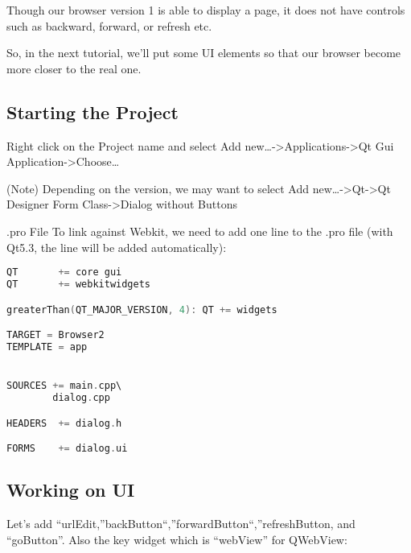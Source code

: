 Though our browser version 1 is able to display a page, it does not have
controls such as backward, forward, or refresh etc.

So, in the next tutorial, we'll put some UI elements so that our browser
become more closer to the real one.

\subsection{Starting the Project}\label{starting-the-project}

Right click on the Project name and select Add
new\ldots{}-\textgreater{}Applications-\textgreater{}Qt Gui
Application-\textgreater{}Choose\ldots{}

(Note) Depending on the version, we may want to select Add
new\ldots{}-\textgreater{}Qt-\textgreater{}Qt Designer Form
Class-\textgreater{}Dialog without Buttons

\begin{figure}[htbp]
\centering
{}
\caption{}
\end{figure}

\begin{figure}[htbp]
\centering
{}
\caption{}
\end{figure}

.pro File To link against Webkit, we need to add one line to the .pro
file (with Qt5.3, the line will be added automatically):

\begin{lstlisting}[language=c++, numbers=none]
QT       += core gui
QT       += webkitwidgets

greaterThan(QT_MAJOR_VERSION, 4): QT += widgets

TARGET = Browser2
TEMPLATE = app


SOURCES += main.cpp\
        dialog.cpp

HEADERS  += dialog.h

FORMS    += dialog.ui
\end{lstlisting}

\subsection{Working on UI}\label{working-on-ui}

Let's add ``urlEdit,''backButton``,''forwardButton``,''refreshButton,
and ``goButton''. Also the key widget which is ``webView'' for QWebView:

